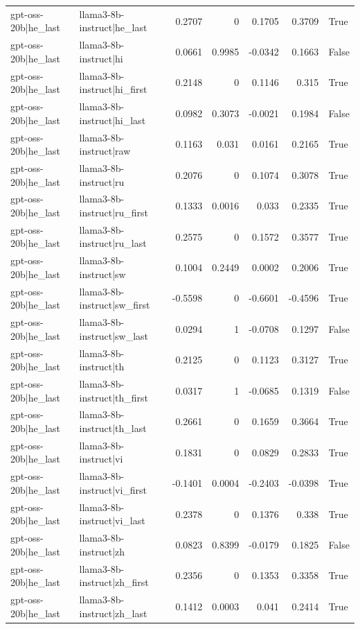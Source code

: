 \begin{table}
\begin{tabular}{l l r r r r l}
gpt-oss-20b|he_last & llama3-8b-instruct|he_last & 0.2707 & 0 & 0.1705 & 0.3709 & True \\
gpt-oss-20b|he_last & llama3-8b-instruct|hi & 0.0661 & 0.9985 & -0.0342 & 0.1663 & False \\
gpt-oss-20b|he_last & llama3-8b-instruct|hi_first & 0.2148 & 0 & 0.1146 & 0.315 & True \\
gpt-oss-20b|he_last & llama3-8b-instruct|hi_last & 0.0982 & 0.3073 & -0.0021 & 0.1984 & False \\
gpt-oss-20b|he_last & llama3-8b-instruct|raw & 0.1163 & 0.031 & 0.0161 & 0.2165 & True \\
gpt-oss-20b|he_last & llama3-8b-instruct|ru & 0.2076 & 0 & 0.1074 & 0.3078 & True \\
gpt-oss-20b|he_last & llama3-8b-instruct|ru_first & 0.1333 & 0.0016 & 0.033 & 0.2335 & True \\
gpt-oss-20b|he_last & llama3-8b-instruct|ru_last & 0.2575 & 0 & 0.1572 & 0.3577 & True \\
gpt-oss-20b|he_last & llama3-8b-instruct|sw & 0.1004 & 0.2449 & 0.0002 & 0.2006 & True \\
gpt-oss-20b|he_last & llama3-8b-instruct|sw_first & -0.5598 & 0 & -0.6601 & -0.4596 & True \\
gpt-oss-20b|he_last & llama3-8b-instruct|sw_last & 0.0294 & 1 & -0.0708 & 0.1297 & False \\
gpt-oss-20b|he_last & llama3-8b-instruct|th & 0.2125 & 0 & 0.1123 & 0.3127 & True \\
gpt-oss-20b|he_last & llama3-8b-instruct|th_first & 0.0317 & 1 & -0.0685 & 0.1319 & False \\
gpt-oss-20b|he_last & llama3-8b-instruct|th_last & 0.2661 & 0 & 0.1659 & 0.3664 & True \\
gpt-oss-20b|he_last & llama3-8b-instruct|vi & 0.1831 & 0 & 0.0829 & 0.2833 & True \\
gpt-oss-20b|he_last & llama3-8b-instruct|vi_first & -0.1401 & 0.0004 & -0.2403 & -0.0398 & True \\
gpt-oss-20b|he_last & llama3-8b-instruct|vi_last & 0.2378 & 0 & 0.1376 & 0.338 & True \\
gpt-oss-20b|he_last & llama3-8b-instruct|zh & 0.0823 & 0.8399 & -0.0179 & 0.1825 & False \\
gpt-oss-20b|he_last & llama3-8b-instruct|zh_first & 0.2356 & 0 & 0.1353 & 0.3358 & True \\
gpt-oss-20b|he_last & llama3-8b-instruct|zh_last & 0.1412 & 0.0003 & 0.041 & 0.2414 & True \\

\end{tabular}
\end{table}
